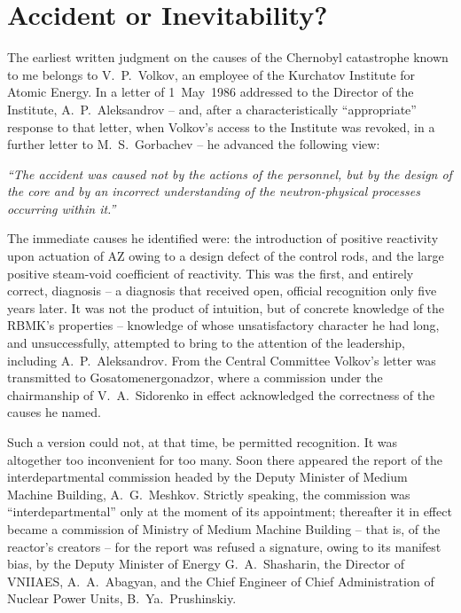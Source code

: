 \documentclass[openright]{bookest}
\begin{document}
\chapter{Accident or Inevitability?}

The earliest written judgment on the causes of the Chernobyl catastrophe known to me belongs to V.~P.~Volkov, an employee of the Kurchatov Institute for Atomic Energy. In a letter of 1~May~1986 addressed to the Director of the Institute, A.~P.~Aleksandrov -- and, after a characteristically ``appropriate'' response to that letter, when Volkov's access to the Institute was revoked, in a further letter to M.~S.~Gorbachev -- he advanced the following view:

\begin{personal}
\textit{``The accident was caused not by the actions of the personnel, but by the design of the core and by an incorrect understanding of the neutron-physical processes occurring within it.''}
\end{personal}

The immediate causes he identified were: the introduction of positive reactivity upon actuation of AZ owing to a design defect of the control rods, and the large positive steam-void coefficient of reactivity. This was the first, and entirely correct, diagnosis -- a diagnosis that received open, official recognition only five years later. It was not the product of intuition, but of concrete knowledge of the RBMK's properties -- knowledge of whose unsatisfactory character he had long, and unsuccessfully, attempted to bring to the attention of the leadership, including A.~P.~Aleksandrov. From the Central Committee Volkov's letter was transmitted to Gosatomenergonadzor, where a commission under the chairmanship of V.~A.~Sidorenko in effect acknowledged the correctness of the causes he named.

Such a version could not, at that time, be permitted recognition. It was altogether too inconvenient for too many. Soon there appeared the report of the interdepartmental commission headed by the Deputy Minister of Medium Machine Building, A.~G.~Meshkov. Strictly speaking, the commission was ``interdepartmental'' only at the moment of its appointment; thereafter it in effect became a commission of Ministry of Medium Machine Building -- that is, of the reactor's creators -- for the report was refused a signature, owing to its manifest bias, by the Deputy Minister of Energy G.~A.~Shasharin, the Director of VNIIAES, A.~A.~Abagyan, and the Chief Engineer of Chief Administration of Nuclear Power Units, B.~Ya.~Prushinskiy.
\end{document}
